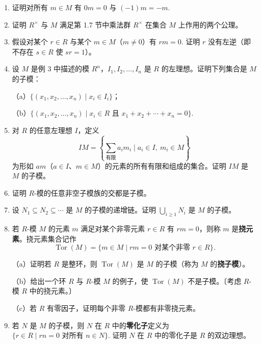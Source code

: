 \begin{enumerate}
\item 证明对所有 \(m \in M\) 有 \(0m = 0\) 与 \((-1)m = -m\).

\item 证明 \(R^\times\) 与 \(M\) 满足第 1.7 节中乘法群 \(R^\times\) 在集合 \(M\) 上作用的两个公理。

\item 假设对某个 \(r \in R\) 与某个 \(m \in M\)（\(m \neq 0\)）有 \(rm = 0\). 证明 \(r\) 没有左逆（即不存在 \(s \in R\) 使 \(sr = 1\)）。

\item 设 \(M\) 是例 3 中描述的模 \(R^n\)，\(I_1, I_2, \ldots, I_n\) 是 \(R\) 的左理想。证明下列集合是 \(M\) 的子模：

（a）\(\{(x_1, x_2, \ldots, x_n) \mid x_i \in I_i\}\)；

（b）\(\{(x_1, x_2, \ldots, x_n) \mid x_i \in R \text{ 且 } x_1+x_2+\cdots+x_n = 0\}\).

\item 对 \(R\) 的任意左理想 \(I\)，定义
\[
IM = \left\{ \sum_{\text{有限}} a_im_i \mid a_i \in I,\ m_i \in M \right\}
\]
为形如 \(am\)（\(a \in I\)、\(m \in M\)）的元素的所有有限和组成的集合。证明 \(IM\) 是 \(M\) 的子模。

\item 证明 \(R\)-模的任意非空子模族的交都是子模。

\item 设 \(N_1 \subseteq N_2 \subseteq \cdots\) 是 \(M\) 的子模的递增链。证明 \(\bigcup_{i \geq 1} N_i\) 是 \(M\) 的子模。

\item 若 \(R\)-模 \(M\) 的元素 \(m\) 满足对某个非零元素 \(r \in R\) 有 \(rm = 0\)，则称 \(m\) 是\textbf{挠元素}。挠元素集合记作
\[
\operatorname{Tor}(M) = \{m \in M \mid rm = 0 \text{ 对某个非零 } r \in R\}.
\]

（a）证明若 \(R\) 是整环，则 \(\operatorname{Tor}(M)\) 是 \(M\) 的子模（称为 \(M\) 的\textbf{挠子模}）。

（b）给出一个环 \(R\) 与 \(R\)-模 \(M\) 的例子，使 \(\operatorname{Tor}(M)\) 不是子模。〔考虑 \(R\)-模 \(R\) 中的挠元素。〕

（c）若 \(R\) 有零因子，证明每个非零 \(R\)-模都有非零挠元素。

\item 若 \(N\) 是 \(M\) 的子模，则 \(N\) 在 \(R\) 中的\textbf{零化子}定义为 \(\{r \in R \mid rn = 0 \text{ 对所有 } n \in N\}\). 证明 \(N\) 在 \(R\) 中的零化子是 \(R\) 的双边理想。


\end{enumerate}
